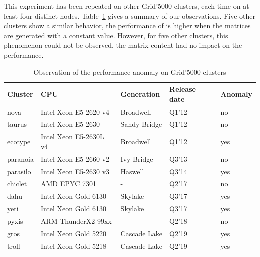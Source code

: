         This experiment has been repeated on other Grid'5000 clusters, each time on at least four distinct nodes.
        Table~\ref{tab:bit-flips} gives a summary of our observations. Five other clusters show a similar behavior, the
        performance of \dgemm is higher when the matrices are generated with a constant value. However, for five
        other clusters, this phenomenon could not be observed, the matrix content had no impact on the performance.

        \begin{table}[htbp]
            \caption{\label{tab:bit-flips}
            Observation of the  performance anomaly on Grid'5000 clusters}
            \centering
            \begin{tabular}{lllll}
                \toprule
                Cluster & CPU & Generation & Release date & Anomaly\\
                \midrule
                nova & Intel Xeon E5-2620 v4 & Broadwell & Q1'12 & no\\
                taurus & Intel Xeon E5-2630 & Sandy Bridge & Q1'12 & no\\
                ecotype & Intel Xeon E5-2630L v4 & Broadwell & Q1'12 &yes\\
                paranoia & Intel Xeon E5-2660 v2 & Ivy Bridge & Q3'13 & no\\
                parasilo & Intel Xeon E5-2630 v3 & Haswell & Q3'14 & yes\\
                chiclet & AMD EPYC 7301 & - & Q2'17 & no\\
                dahu & Intel Xeon Gold 6130 & Skylake & Q3'17 & yes\\
                yeti & Intel Xeon Gold 6130 & Skylake & Q3'17 &yes\\
                pyxis & ARM ThunderX2 99xx & - & Q2'18 & no\\
                gros & Intel Xeon Gold 5220 & Cascade Lake & Q2'19 & yes\\
                troll & Intel Xeon Gold 5218 & Cascade Lake & Q2'19 & yes\\
                \bottomrule
            \end{tabular}
        \end{table}


